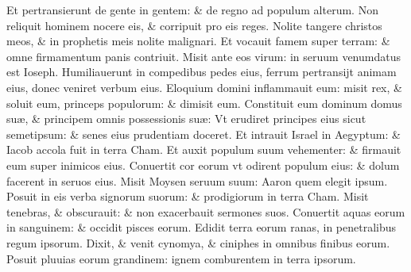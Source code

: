 \documentclass[a5paper,10pt]{book}
\def\ae{æ}
\begin{document}
\begin{multicols*}{2}
\newline \color{red} E\color{black}t pertransierunt de gente in gentem: \& de regno ad populum alterum.
\newline \color{red} N\color{black}on reliquit hominem nocere eis, \& corripuit pro eis reges.
\newline \color{red} N\color{black}olite tangere christos meos, \& in prophetis meis nolite malignari.
\newline \color{red} E\color{black}t vocauit famem super terram: \& omne firmamentum panis contriuit.
\newline \color{red} M\color{black}isit ante eos virum: in seruum venumdatus est Ioseph.
\newline \color{red} H\color{black}umiliauerunt in compedibus pedes eius, ferrum pertransijt animam eius, donec veniret verbum eius.
\newline \color{red} E\color{black}loquium domini inflammauit eum: misit rex, \& soluit eum, princeps populorum: \& dimisit eum.
\newline \color{red} C\color{black}onstituit eum dominum domus su\ae , \& principem omnis possessionis su\ae :
\newline \color{red} V\color{black}t erudiret principes eius sicut semetipsum: \& senes eius prudentiam doceret.
\newline \color{red} E\color{black}t intrauit Israel in Aegyptum: \& Iacob accola fuit in terra Cham.
\newline \color{red} E\color{black}t auxit populum suum vehementer: \& firmauit eum super inimicos eius.
\newline \color{red} C\color{black}onuertit cor eorum vt odirent populum eius: \& dolum facerent in seruos eius.
\newline \color{red} M\color{black}isit Moysen seruum suum: Aaron quem elegit ipsum.
\newline \color{red} P\color{black}osuit in eis verba signorum suorum: \& prodigiorum in terra Cham.
\newline \color{red} M\color{black}isit tenebras, \& obscurauit: \& non exacerbauit sermones suos.
\newline \color{red} C\color{black}onuertit aquas eorum in sanguinem: \& occidit pisces eorum.
\newline \color{red} E\color{black}didit terra eorum ranas, in penetralibus regum ipsorum.
\newline \color{red} D\color{black}ixit, \& venit cynomya, \& ciniphes in omnibus finibus eorum.
\newline \color{red} P\color{black}osuit pluuias eorum grandinem: ignem comburentem in terra ipsorum.

\end{multicols*}
\end{document}
